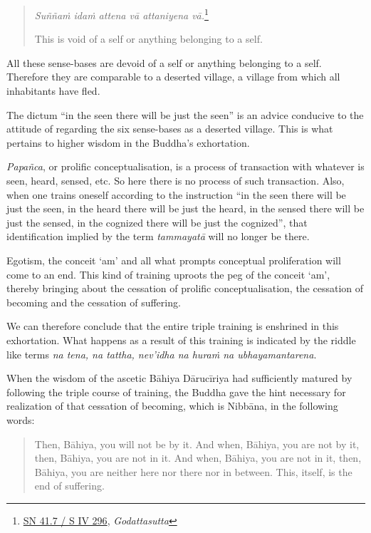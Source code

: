 \enlargethispage*{\baselineskip}

\begin{quote}
\emph{Suññaṁ idaṁ attena vā attaniyena vā.}\footnote{\href{https://suttacentral.net/sn41.7/pli/ms}{SN 41.7 / S IV 296}, \emph{Godattasutta}}

This is void of a self or anything belonging to a self.
\end{quote}

All these sense-bases are devoid of a self or anything belonging to a self. Therefore they are comparable to a deserted village, a village from which all inhabitants have fled.

The dictum ``in the seen there will be just the seen'' is an advice conducive to the attitude of regarding the six sense-bases as a deserted village. This is what pertains to higher wisdom in the Buddha's exhortation.

\emph{Papañca}, or prolific conceptualisation, is a process of transaction with whatever is seen, heard, sensed, etc. So here there is no process of such transaction. Also, when one trains oneself according to the instruction ``in the seen there will be just the seen, in the heard there will be just the heard, in the sensed there will be just the sensed, in the cognized there will be just the cognized'', that identification implied by the term \emph{tammayatā} will no longer be there.

Egotism, the conceit `am' and all what prompts conceptual proliferation will come to an end. This kind of training uproots the peg of the conceit `am', thereby bringing about the cessation of prolific conceptualisation, the cessation of becoming and the cessation of suffering.

We can therefore conclude that the entire triple training is enshrined in this exhortation. What happens as a result of this training is indicated by the riddle like terms \emph{na tena, na tattha, nev'idha na huraṁ na ubhayamantarena}.

When the wisdom of the ascetic Bāhiya Dārucīriya had sufficiently matured by following the triple course of training, the Buddha gave the hint necessary for realization of that cessation of becoming, which is Nibbāna, in the following words:

\begin{quote}
Then, Bāhiya, you will not be by it. And when, Bāhiya, you are not by it, then, Bāhiya, you are not in it. And when, Bāhiya, you are not in it, then, Bāhiya, you are neither here nor there nor in between. This, itself, is the end of suffering.
\end{quote}

